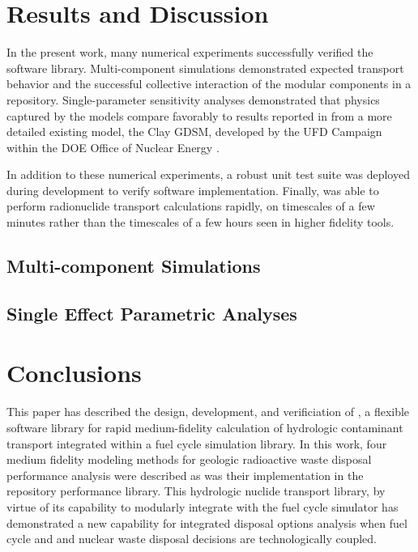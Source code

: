 \section{Results and Discussion}
\label{sec:results}

In the present work, many numerical experiments successfully verified the \Cyder software library.
Multi-component simulations demonstrated expected transport behavior and
the successful collective interaction of the modular
components in a \Cyder repository. Single-parameter sensitivity analyses
demonstrated that physics captured by the \Cyder models compare favorably to
results reported in \cite{huff_key_2012} from a more detailed existing model,
the Clay \gls{GDSM}, developed by the \gls{UFD} Campaign within the
\gls{DOE} Office of Nuclear Energy \cite{clayton_generic_2011}.

In addition to these numerical experiments, a robust unit test suite was
deployed during development to verify \Cyder software implementation.
Finally, \Cyder was able to perform radionuclide transport calculations
rapidly, on timescales of a few minutes rather than the timescales of a few
hours seen in higher fidelity tools.

\subsection{Multi-component Simulations}




\subsection{Single Effect Parametric Analyses}


\section{Conclusions}

This paper has described the design, development, and verificiation of \Cyder, a
flexible software library for rapid medium-fidelity calculation of hydrologic
contaminant transport integrated within a fuel cycle simulation library.
In this work, four medium fidelity modeling methods for geologic radioactive waste disposal
performance analysis were described as was their implementation in the \Cyder
repository performance library.  This hydrologic
nuclide transport library, by virtue of its capability to modularly integrate
with the \Cyclus fuel cycle simulator has demonstrated a new capability for
integrated disposal options analysis when fuel cycle and and nuclear waste
disposal decisions are technologically coupled. 

